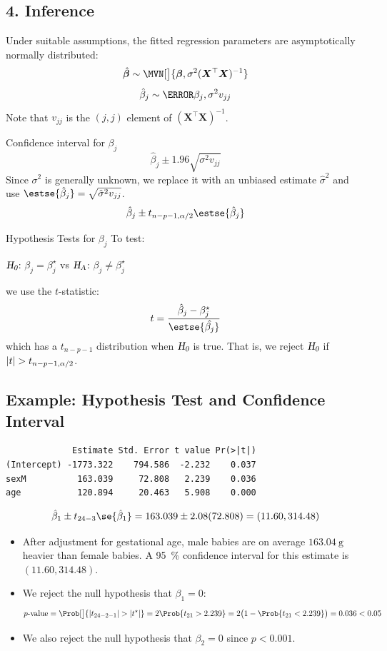 \documentclass[oneside]{book}\usepackage[]{graphicx}\usepackage[svgnames]{xcolor}
\makeatletter
\newenvironment{kframe}{%
 \def\at@end@of@kframe{}%
 \ifinner\ifhmode%
  \def\at@end@of@kframe{\end{minipage}}%
  \begin{minipage}{\columnwidth}%
 \fi\fi%
 \def\FrameCommand##1{\hskip\@totalleftmargin \hskip-\fboxsep
 \colorbox{shadecolor}{##1}\hskip-\fboxsep
     \hskip-\linewidth \hskip-\@totalleftmargin \hskip\columnwidth}%
 \MakeFramed {\advance\hsize-\width
   \@totalleftmargin\z@ \linewidth\hsize
   \@setminipage}}%
 {\par\unskip\endMakeFramed%
 \at@end@of@kframe}
\newenvironment{knitrout}{}{} %
\newcommand{\HN}{\textsl{H}_{\textsl{0}}}%
\newcommand{\HA}{\textsl{H}_{\textsl{A}}}%
\DeclarePairedDelimiter\abs{\lvert}{\rvert}
\providecommand{\RandomVector}[1]{\bm{#1}}%
\providecommand{\Vector}[1]{\bm{#1}}%
\providecommand{\Matrix}[1]{\bm{#1}}
\makeatother
\begin{document}
\subsection*{4. Inference}
Under suitable assumptions, the fitted regression parameters are asymptotically
normally distributed:
\[ \hat{\RandomVector{\beta}} \sim \MVN[\big]{\Vector{\beta},\sigma^2 (\Matrix{X}^\top \Matrix{X})^{-1}} \]
\[ \hat{\beta}_j \sim \N{\beta_j,\sigma^2 v_{jj}} \]
Note that $ v_{jj} $ is the $ (j,j) $ element of $ (\Matrix{X}^\top \Matrix{X})^{-1} $.
\begin{Regular}{Confidence interval for $ \beta_j $}
      \[ \hat{\beta}_j\pm 1.96\sqrt{\sigma^2v_{jj}} \]
      Since $ \sigma^2 $ is generally unknown, we replace it with an unbiased estimate $ \hat{\sigma}^2 $ and use
      $ \estse{\hat{\beta}_j}=\sqrt{\hat{\sigma}^2 v_{jj}} $.
      \[ \hat{\beta}_j\pm t_{n-p-1,\alpha/2}\estse{\hat{\beta}_j} \]
\end{Regular}
\begin{Regular}{Hypothesis Tests for $ \beta_j $}
      To test:
      \begin{center}
            $ \HN $: $ \beta_j=\beta_j^\star $ vs $ \HA $: $ \beta_j\ne \beta_j^\star $
      \end{center}
      we use the $ t $-statistic:
      \[ t=\frac{\hat{\beta}_j-\beta_j^\star}{\estse{\hat{\beta_j}}}  \]
      which has a $ t_{n-p-1} $ distribution when $ \HN  $ is true. That is, we reject
      $ \HN  $ if $ \abs{t}>t_{n-p-1,\alpha/2} $.
\end{Regular}
\subsection*{Example: Hypothesis Test and Confidence Interval}
\begin{knitrout}
\color{fgcolor}\begin{kframe}
\begin{verbatim}
             Estimate Std. Error t value Pr(>|t|)
(Intercept) -1773.322    794.586  -2.232    0.037
sexM          163.039     72.808   2.239    0.036
age           120.894     20.463   5.908    0.000
\end{verbatim}
\end{kframe}
\end{knitrout}
\[ \hat{\beta}_1\pm t_{24-3}\se{\hat{\beta}_1}=163.039\pm 2.08(72.808)=(11.60,314.48) \]
\begin{itemize}
      \item After adjustment for gestational age, male babies are on average $\qty{163.04}{\gram}$ heavier
            than female babies. A \qty{95}{\percent} confidence interval for this estimate is $ (11.60,314.48) $.
      \item We reject the null hypothesis that $ \beta_1=0 $:
            \[ p\text{-value}=\Prob[\big]{\abs{t_{24-2-1}}>\abs{t^\star}}=2\Prob{t_{21}>2.239}=2\bigl(1-\Prob{t_{21}<2.239}\bigr)=0.036<0.05 \]
      \item We also reject the null hypothesis that $ \beta_2=0 $ since $ p<0.001 $.
\end{itemize}
\end{document}
